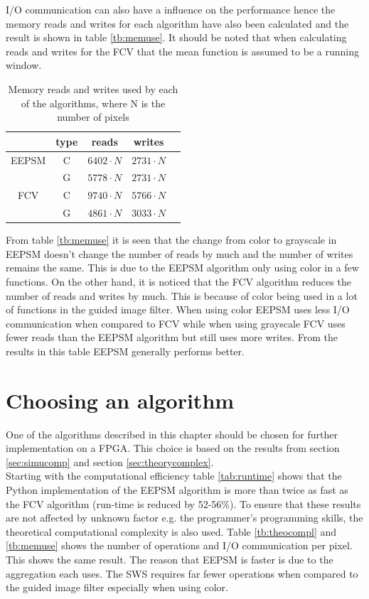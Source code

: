 I/O communication can also have a influence on the performance hence the memory reads and writes for each algorithm have also been calculated and the result is shown in table \vref{tb:memuse}. It should be noted that when calculating reads and writes for the FCV that the mean function is assumed to be a running window.\\
\begin{table}[ht!]
  \centering
  \begin{tabular}{c c c c c }
    \toprule
    & type & reads & writes \\
    \midrule
    EEPSM & C & $6402 \cdot N$ & $2731 \cdot N$  \\
    & G & $5778 \cdot N$ & $2731 \cdot N$ \\
    FCV & C & $9740 \cdot N$ & $5766 \cdot N$ \\
    & G & $4861 \cdot N$ & $3033 \cdot N$ \\
    \bottomrule
  \end{tabular}
  \caption{Memory reads and writes used by each of the algorithms, where N is the number of pixels}
  \label{tb:memuse}
\end{table}

From table \vref{tb:memuse} it is seen that the change from color to grayscale in EEPSM doesn't change the number of reads by much and the number of writes remains the same. This is due to the EEPSM algorithm only using color in a few functions. On the other hand, it is noticed that the FCV algorithm reduces the number of reads and writes by much. This is because of color being used in a lot of functions in the guided image filter. When using color EEPSM uses less I/O communication when compared to FCV while when using grayscale FCV uses fewer reads than the EEPSM algorithm but still uses more writes. From the results in this table EEPSM generally performs better.

\section{Choosing an algorithm}
One of the algorithms described in this chapter should be chosen for further implementation on a FPGA. This choice is based on the results from section \vref{sec:simucomp} and section \vref{sec:theorycomplex}. \\

Starting with the computational efficiency table \ref{tab:runtime} shows that the Python implementation of the EEPSM algorithm is more than twice as fast as the FCV algorithm (run-time is reduced by 52-56\%). To ensure that these results are not affected by unknown factor e.g. the programmer's programming skills, the theoretical computational complexity is also used. Table \vref{tb:theocompl} and \vref{tb:memuse} shows the number of operations and I/O communication per pixel. This shows the same result. The reason that EEPSM is faster is due to the aggregation each uses. The SWS requires far fewer operations when compared to the guided image filter especially when using color.\\

